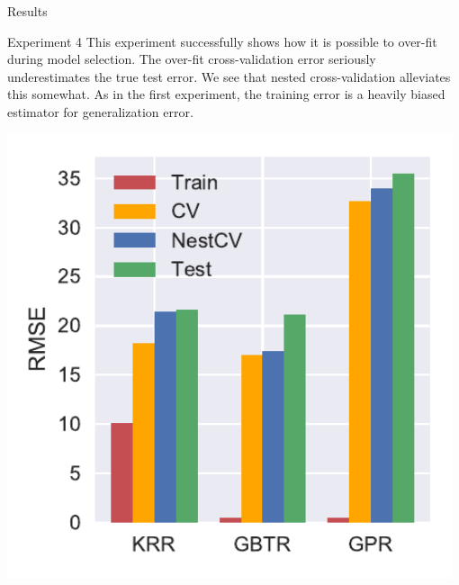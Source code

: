 \documentclass[onecolumn,abstract,paper=letter]{scrartcl}
\begin{document}
\begin{section}{Results}
\begin{subsection}{Experiment 4}
This experiment successfully shows how it is possible to over-fit during model selection. 
The over-fit cross-validation error seriously underestimates the true test error. 
We see that nested cross-validation alleviates this somewhat.
As in the first experiment, the training error is a heavily biased estimator for generalization error. 

\begin{table}[ht]
  \begin{minipage}[b]{0.69\textwidth}
    \centering
    \small
    \end{minipage}
  \begin{minipage}[b]{0.3\textwidth}
    \centering
    \includegraphics[width=0.98\textwidth]{plots/errors-3x3.pdf}

\end{minipage}
\end{table}
\end{subsection}
\end{section}
\end{document}
